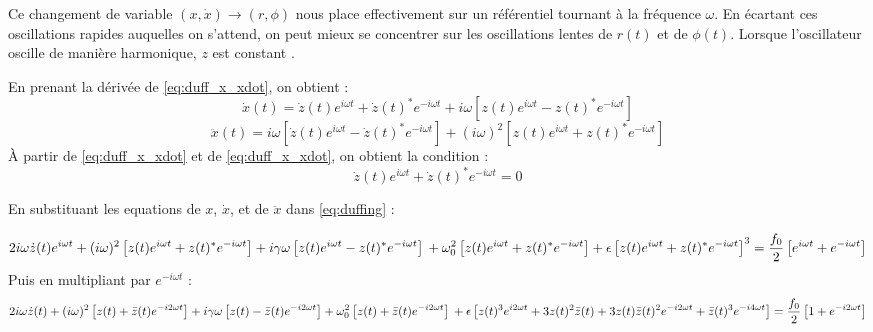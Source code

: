 Ce changement de variable $(x, \dot{x}) \to (r, \phi)$ nous place effectivement sur un référentiel tournant à la fréquence $\omega$. 
En écartant ces oscillations rapides auquelles on s'attend, on peut mieux se concentrer sur les oscillations lentes de $r(t)$ et de $\phi(t)$. 
Lorsque l'oscillateur oscille de manière harmonique, $z$ est constant \cite{pistolesi_duffing_nodate}.

En prenant la dérivée de \eqref{eq:duff_x_xdot}, on obtient :
\begin{equation}
    \dot{x}(t) = \dot{z}(t)e^{i\omega t} + \dot{z}(t)^* e^{-i\omega t} + i\omega \left[ z(t)e^{i\omega t} - z(t)^* e^{-i\omega t} \right]
    \label{eq:duff_x}
\end{equation}
\begin{equation}
    \ddot{x}(t) = i\omega \left[ \dot{z}(t)e^{i\omega t} - \dot{z}(t)^* e^{-i\omega t} \right] + (i\omega)^2 \left[ z(t)e^{i\omega t} + z(t)^* e^{-i\omega t} \right]
\end{equation}
À partir de \eqref{eq:duff_x_xdot} et de \eqref{eq:duff_x_xdot}, on obtient la condition :
\begin{equation}
    \dot{z}(t)e^{i\omega t} + \dot{z}(t)^* e^{-i\omega t} = 0
\end{equation}

En substituant les equations de $x$, $\dot{x}$, et de $\ddot{x}$ dans \eqref{eq:duffing} :

\begin{dmath}
    2i\omega \dot{z}(t)e^{i\omega t} + (i\omega)^2 \left[ z(t)e^{i\omega t} + z(t)^* e^{-i\omega t} \right]
    + i\gamma\omega \left[ z(t)e^{i\omega t} - z(t)^* e^{-i\omega t} \right] \\
    + \omega_0^2 \left[ z(t)e^{i\omega t} + z(t)^* e^{-i\omega t} \right]
    + \epsilon \left[ z(t)e^{i\omega t} + z(t)^* e^{-i\omega t} \right]^3 = \frac{f_0}{2}\left[ e^{i\omega t} + e^{-i\omega t} \right]
\end{dmath}
Puis en multipliant par $e^{-i\omega t}$ :
\begin{dmath}
    2i\omega \dot{z}(t) + (i\omega)^2 \left[ z(t) + \bar{z}(t) e^{-i 2 \omega t} \right]
    + i\gamma\omega \left[ z(t) - \bar{z}(t) e^{-i 2 \omega t} \right]
    + \omega_0^2 \left[ z(t) + \bar{z}(t) e^{-i 2 \omega t} \right] \\
    + \epsilon \left[ z(t)^3 e^{i 2 \omega t} + 3 z(t)^2 \bar{z}(t) + 3z(t)\bar{z}(t)^2 e^{-i2\omega t} + \bar{z}(t)^3 e^{-i4 \omega t} \right]
    = \frac{f_0}{2}\left[ 1 + e^{-i 2 \omega t} \right]
    \label{eq:duff_pre_av}
\end{dmath}

